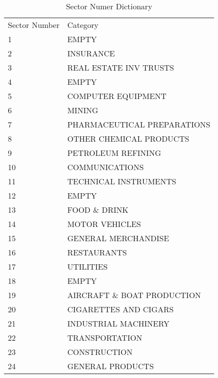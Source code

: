 \begin{table}[H]
\footnotesize
\centering
\caption{Sector Numer Dictionary}
\label{sector}
\begin{tabular}{ll}
Sector Number & Category                                \\
1             & EMPTY                                   \\
2             & INSURANCE                               \\
3             & REAL ESTATE INV TRUSTS                  \\
4             & EMPTY                                   \\
5             & COMPUTER EQUIPMENT                      \\
6             & MINING                                  \\
7             & PHARMACEUTICAL PREPARATIONS             \\
8             & OTHER CHEMICAL PRODUCTS                 \\
9             & PETROLEUM REFINING                      \\
10            & COMMUNICATIONS                          \\
11            & TECHNICAL INSTRUMENTS                   \\
12            & EMPTY                                   \\
13            & FOOD \& DRINK                           \\
14            & MOTOR VEHICLES                          \\
15            & GENERAL MERCHANDISE                     \\
16            & RESTAURANTS                             \\
17            & UTILITIES                               \\
18            & EMPTY                                   \\
19            & AIRCRAFT \& BOAT PRODUCTION             \\
20            & CIGARETTES AND CIGARS                   \\
21            & INDUSTRIAL MACHINERY                    \\
22            & TRANSPORTATION                          \\
23            & CONSTRUCTION                            \\
24            & GENERAL PRODUCTS                        \\

\end{tabular}
\end{table}
